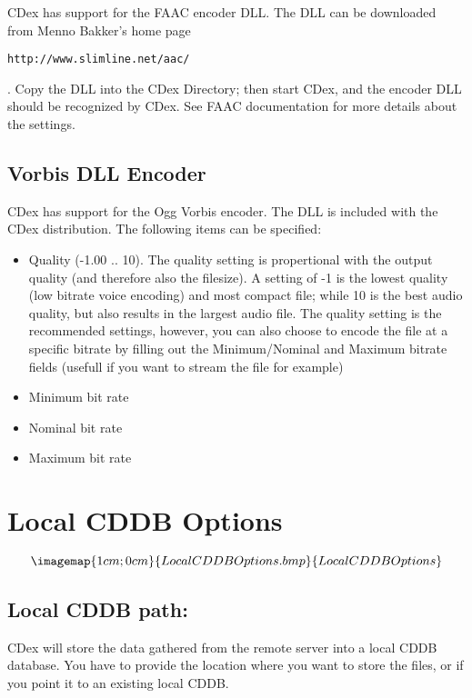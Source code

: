 CDex has support for the FAAC encoder DLL. The DLL can be downloaded from Menno Bakker's home page
\begin{verbatim}
http://www.slimline.net/aac/
\end{verbatim}.
Copy the DLL into the CDex Directory; then start CDex, and the
encoder DLL should be recognized by CDex. See FAAC documentation for more details about the settings.

\subsection{Vorbis DLL Encoder}

CDex has support for the Ogg Vorbis encoder. The DLL is included with the CDex distribution. The following 
items can be specified:

\begin{itemize}
\itemsep=0pt
\item Quality (-1.00 .. 10). The quality setting is propertional with the 
output quality (and therefore also the filesize).  A setting of -1 
is the lowest quality (low bitrate voice encoding) and most compact file;
while 10 is the best audio quality, but also results in the largest audio file. The quality
setting is the recommended settings, however, you can also choose to encode the file at a 
specific bitrate by filling out the Minimum/Nominal and Maximum bitrate fields (usefull if 
you want to stream the file for example)

\item Minimum bit rate
\item Nominal bit rate
\item Maximum bit rate
\end{itemize}


\section{Local CDDB Options}\label{localcddbsettings}


$$\imagemap{1cm;0cm}{LocalCDDBOptions.bmp}{LocalCDDBOptions}$$


\subsection{Local CDDB path:}

CDex will store the data gathered from the remote server into a local CDDB
database. You have to provide the location where you want to store the files,
or if you point it to an existing local CDDB.



